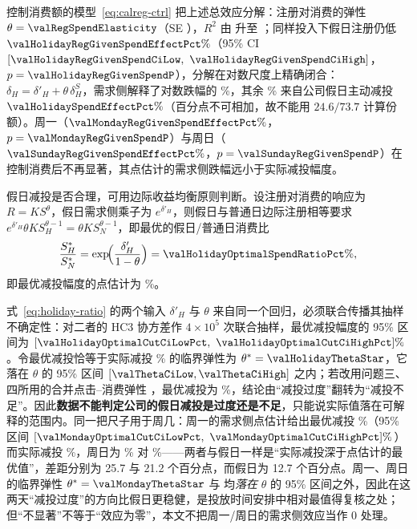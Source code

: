 控制消费额的模型~\eqref{eq:calreg-ctrl} 把上述总效应分解：注册对消费的弹性 $\theta=\valRegSpendElasticity$（SE \valRegSpendElasticitySe），$R^2$ 由 \valRegCalendarRsq{} 升至 \valRegGivenSpendRsq；同样投入下假日注册仍低 $\valHolidayRegGivenSpendEffectPct\%$（95\% CI $[\valHolidayRegGivenSpendCiLow,\ \valHolidayRegGivenSpendCiHigh]$，$p=\valHolidayRegGivenSpendP$），分解在对数尺度上精确闭合：$\delta_H=\delta'_H+\theta\,\delta^{S}_H$，需求侧解释了对数跌幅的 \valHolidayDemandLogSharePct\%，其余 \valHolidaySupplyLogSharePct\% 来自公司假日主动减投 $\valHolidaySpendEffectPct\%$（百分点不可相加，故不能用 $24.6/73.7$ 计算份额）。周一（$\valMondayRegGivenSpendEffectPct\%$，$p=\valMondayRegGivenSpendP$）与周日（$\valSundayRegGivenSpendEffectPct\%$，$p=\valSundayRegGivenSpendP$）在控制消费后不再显著，其点估计的需求侧跌幅远小于实际减投幅度。

假日减投是否合理，可用边际收益均衡原则判断。设注册对消费的响应为 $R=K S^{\theta}$，假日需求侧乘子为 $e^{\delta'_H}$，则假日与普通日边际注册相等要求 $e^{\delta'_H}\theta K S_H^{\theta-1}=\theta K S_N^{\theta-1}$，即最优的假日/普通日消费比
\begin{equation}\label{eq:holiday-ratio}
\frac{S_H^{*}}{S_N^{*}}=\exp\!\Bigl(\frac{\delta'_H}{1-\theta}\Bigr)=\valHolidayOptimalSpendRatioPct\%,
\end{equation}
即最优减投幅度的点估计为 \valHolidayOptimalCutPct\%。

式~\eqref{eq:holiday-ratio} 的两个输入 $\delta'_H$ 与 $\theta$ 来自同一个回归，必须联合传播其抽样不确定性：对二者的 HC3 协方差作 $4\times10^{5}$ 次联合抽样，最优减投幅度的 95\% 区间为 $[\valHolidayOptimalCutCiLowPct,\ \valHolidayOptimalCutCiHighPct]\%$。令最优减投恰等于实际减投 \valHolidayActualCutPct\% 的临界弹性为 $\theta^{*}=\valHolidayThetaStar$，它落在 $\theta$ 的 95\% 区间 $[\valThetaCiLow,\valThetaCiHigh]$ 之内；若改用问题三、四所用的合并点击--消费弹性 \valPooledGamma，最优减投为 \valHolidayCutAtPooledGammaPct\%，结论由“减投过度”翻转为“减投不足”。因此\textbf{数据不能判定公司的假日减投是过度还是不足}，只能说实际值落在可解释的范围内。同一把尺子用于周几：周一的需求侧点估计给出最优减投 \valMondayOptimalCutPct\%（95\% 区间 $[\valMondayOptimalCutCiLowPct,\ \valMondayOptimalCutCiHighPct]\%$）而实际减投 \valMondayActualCutPct\%，周日为 \valSundayOptimalCutPct\% 对 \valSundayActualCutPct\%——两者与假日一样是“实际减投深于点估计的最优值”，差距分别为 \num{25.7} 与 \num{21.2} 个百分点，而假日为 \num{12.7} 个百分点。周一、周日的临界弹性 $\theta^{*}=\valMondayThetaStar$ 与 \valSundayThetaStar{} 均\emph{落在} $\theta$ 的 95\% 区间之外，因此在这两天“减投过度”的方向比假日更稳健，是投放时间安排中相对最值得复核之处；但“不显著”不等于“效应为零”，本文不把周一/周日的需求侧效应当作 $0$ 处理。

